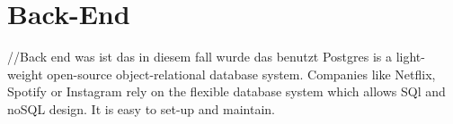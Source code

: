 \section{Back-End}
//Back end was ist das in diesem fall wurde das benutzt
Postgres is a light-weight open-source object-relational database system. 
Companies like Netflix, Spotify or Instagram \parencite{postgresUsers} rely on the flexible database system which allows SQl and noSQL design.
It is easy to set-up and maintain. 


